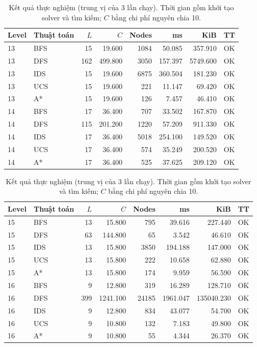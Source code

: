 \begin{table}[htbp]
\centering
\small
\begin{tabular}{llrrrrrl}
\hline
Level & Thuật toán & $L$ & $C$ & Nodes & ms & KiB & TT \\
\hline
13 & BFS & 15 & 19.600 & 1084 & 50.085 & 357.910 & OK \\
13 & DFS & 162 & 499.800 & 3050 & 157.397 & 5749.600 & OK \\
13 & IDS & 15 & 19.600 & 6875 & 360.504 & 181.230 & OK \\
13 & UCS & 15 & 19.600 & 221 & 11.147 & 69.420 & OK \\
13 & A* & 15 & 19.600 & 126 & 7.457 & 46.410 & OK \\
14 & BFS & 17 & 36.400 & 707 & 33.502 & 167.870 & OK \\
14 & DFS & 115 & 201.200 & 1220 & 57.209 & 911.330 & OK \\
14 & IDS & 17 & 36.400 & 5018 & 254.100 & 149.520 & OK \\
14 & UCS & 17 & 36.400 & 574 & 35.249 & 200.520 & OK \\
14 & A* & 17 & 36.400 & 525 & 37.625 & 209.120 & OK \\
\hline
\end{tabular}
\caption{Kết quả thực nghiệm (trung vị của 3 lần chạy). Thời gian gồm khởi tạo solver và tìm kiếm; $C$ bằng chi phí nguyên chia 10.}
\end{table}

\begin{table}[htbp]
\centering
\small
\begin{tabular}{llrrrrrl}
\hline
Level & Thuật toán & $L$ & $C$ & Nodes & ms & KiB & TT \\
\hline
15 & BFS & 13 & 15.800 & 795 & 39.616 & 227.440 & OK \\
15 & DFS & 63 & 144.800 & 65 & 3.542 & 46.610 & OK \\
15 & IDS & 13 & 15.800 & 3850 & 194.188 & 147.000 & OK \\
15 & UCS & 13 & 15.800 & 222 & 10.658 & 62.880 & OK \\
15 & A* & 13 & 15.800 & 174 & 9.959 & 56.590 & OK \\
16 & BFS & 9 & 12.800 & 319 & 16.289 & 128.710 & OK \\
16 & DFS & 399 & 1241.100 & 24185 & 1961.047 & 135040.230 & OK \\
16 & IDS & 9 & 12.800 & 834 & 43.077 & 54.700 & OK \\
16 & UCS & 9 & 10.800 & 132 & 7.183 & 49.800 & OK \\
16 & A* & 9 & 10.800 & 55 & 4.344 & 26.370 & OK \\
\hline
\end{tabular}
\caption{Kết quả thực nghiệm (trung vị của 3 lần chạy). Thời gian gồm khởi tạo solver và tìm kiếm; $C$ bằng chi phí nguyên chia 10.}
\end{table}


